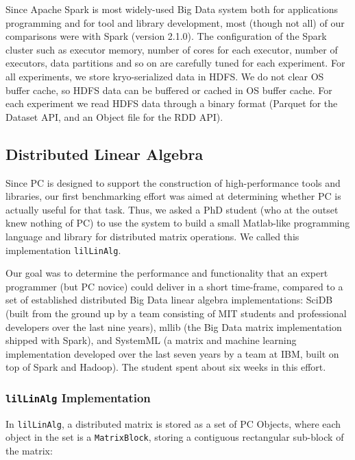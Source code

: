 Since Apache Spark is most widely-used Big Data system both for applications programming and for tool and library
development, most
(though not all) of our comparisons were with Spark (version
2.1.0). The configuration of the Spark cluster such as
executor memory, number of cores for each executor, number of
executors, data partitions and so on are carefully tuned for each
experiment.  For all experiments, we store kryo-serialized data in
HDFS. We do not clear OS buffer cache, so HDFS data can be buffered or
cached in OS buffer cache. For each experiment we read HDFS data
through a binary format (Parquet for the Dataset API,
and an Object file for the RDD API).


\subsection {Distributed Linear Algebra}

Since PC is designed to support the construction
of high-performance tools and libraries, our first benchmarking effort was aimed at determining 
whether PC is actually useful for that task.  Thus, we asked
a PhD student (who at the outset knew nothing of PC) 
to use the system to build a small Matlab-like 
programming language and library for distributed matrix operations.
We called this implementation \texttt{lilLinAlg}.

Our goal was to determine the 
performance and functionality that an expert programmer (but PC novice) could deliver in a short
time-frame, compared to a set of established distributed Big Data linear algebra implementations:
SciDB \cite{brown2010overview, stonebraker2011architecture} (built from the ground up by a team
consisting of MIT students and professional developers over the last nine years), mllib \cite{meng2016mllib} 
(the Big Data matrix
implementation shipped with Spark), and SystemML \cite{boehm2014hybrid, ghoting2011systemml, boehm2016systemml}
(a matrix and machine learning implementation developed
over the last seven years by a team at IBM, built on top of Spark and Hadoop).
The student spent about six weeks in this effort.

\subsubsection{\texttt{lilLinAlg} Implementation}

In \texttt{lilLinAlg}, a distributed matrix is stored as a set of PC Objects, where each 
object in the set is a \texttt{MatrixBlock}, storing a contiguous rectangular sub-block of the matrix:

